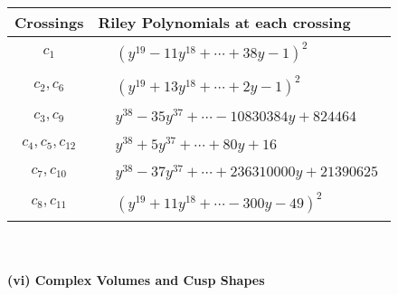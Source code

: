 \documentclass[1p]{elsarticle_modified}
\theoremstyle{definition}
\begin{document}
\begin{tabular}{m{50pt}|m{274pt}}
Crossings & \hspace{64pt}Riley Polynomials at each crossing \\
\hline $$\begin{aligned}c_{1}\end{aligned}$$&$\begin{aligned}
&(y^{19}-11 y^{18}+\cdots+38 y-1)^{2}
\end{aligned}$\\
\hline $$\begin{aligned}c_{2},c_{6}\end{aligned}$$&$\begin{aligned}
&(y^{19}+13 y^{18}+\cdots+2 y-1)^{2}
\end{aligned}$\\
\hline $$\begin{aligned}c_{3},c_{9}\end{aligned}$$&$\begin{aligned}
&y^{38}-35 y^{37}+\cdots-10830384 y+824464
\end{aligned}$\\
\hline $$\begin{aligned}c_{4},c_{5},c_{12}\end{aligned}$$&$\begin{aligned}
&y^{38}+5 y^{37}+\cdots+80 y+16
\end{aligned}$\\
\hline $$\begin{aligned}c_{7},c_{10}\end{aligned}$$&$\begin{aligned}
&y^{38}-37 y^{37}+\cdots+236310000 y+21390625
\end{aligned}$\\
\hline $$\begin{aligned}c_{8},c_{11}\end{aligned}$$&$\begin{aligned}
&(y^{19}+11 y^{18}+\cdots-300 y-49)^{2}
\end{aligned}$\\
\hline
\end{tabular}\\~\\
\newpage\flushleft \textbf{(vi) Complex Volumes and Cusp Shapes}
\end{document}
